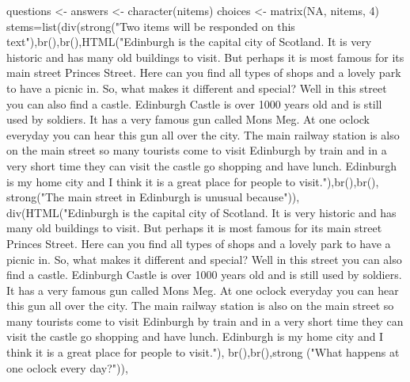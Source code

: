 \documentclass[
]{article}
\newenvironment{Shaded}{\begin{snugshade}}{\end{snugshade}}
\newcommand{\ConstantTok}[1]{\textcolor[rgb]{0.00,0.00,0.00}{#1}}
\newcommand{\DecValTok}[1]{\textcolor[rgb]{0.00,0.00,0.81}{#1}}
\newcommand{\FunctionTok}[1]{\textcolor[rgb]{0.00,0.00,0.00}{#1}}
\newcommand{\NormalTok}[1]{#1}
\newcommand{\OtherTok}[1]{\textcolor[rgb]{0.56,0.35,0.01}{#1}}
\newcommand{\StringTok}[1]{\textcolor[rgb]{0.31,0.60,0.02}{#1}}
\begin{document}
\begin{Shaded}
\begin{Highlighting}[]
\NormalTok{questions }\OtherTok{\textless{}{-}}\NormalTok{ answers }\OtherTok{\textless{}{-}} \FunctionTok{character}\NormalTok{(nitems)}
\NormalTok{choices }\OtherTok{\textless{}{-}} \FunctionTok{matrix}\NormalTok{(}\ConstantTok{NA}\NormalTok{, nitems, }\DecValTok{4}\NormalTok{)}
\NormalTok{stems}\OtherTok{=}\FunctionTok{list}\NormalTok{(}\FunctionTok{div}\NormalTok{(}\FunctionTok{strong}\NormalTok{(}\StringTok{"Two items will be responded on this text"}\NormalTok{),}\FunctionTok{br}\NormalTok{(),}\FunctionTok{br}\NormalTok{(),}\FunctionTok{HTML}\NormalTok{(}\StringTok{"Edinburgh is the capital city of Scotland. It is very historic and has many old buildings to visit. But perhaps it is most famous for its main street  Princes Street. Here can you find all types of shops and a lovely park to have a picnic in. So, what makes it different and special? Well in this street you can also find a castle. Edinburgh Castle is over 1000 years old and is still used by soldiers. It has a very famous gun called Mons Meg. At one oclock everyday you can hear this gun all over the city. The main railway station is also on the main street so many tourists come to visit Edinburgh by train and in a very short time they can visit the castle go shopping and have lunch. Edinburgh is my home city and I think it is a great place for people to visit."}\NormalTok{),}\FunctionTok{br}\NormalTok{(),}\FunctionTok{br}\NormalTok{(), }\FunctionTok{strong}\NormalTok{(}\StringTok{"The main street in Edinburgh is unusual because"}\NormalTok{)),}
           \FunctionTok{div}\NormalTok{(}\FunctionTok{HTML}\NormalTok{(}\StringTok{"Edinburgh is the capital city of Scotland. It is very historic and has many old buildings to visit. But perhaps it is most famous for its main street  Princes Street. Here can you find all types of shops and a lovely park to have a picnic in. So, what makes it different and special? Well in this street you can also find a castle. Edinburgh Castle is over 1000 years old and is still used by soldiers. It has a very famous gun called Mons Meg. At one oclock everyday you can hear this gun all over the city. The main railway station is also on the main street so many tourists come to visit Edinburgh by train and in a very short time they can visit the castle go shopping and have lunch. Edinburgh is my home city and I think it is a great place for people to visit."}\NormalTok{), }\FunctionTok{br}\NormalTok{(),}\FunctionTok{br}\NormalTok{(),}\FunctionTok{strong}\NormalTok{ (}\StringTok{"What happens at one oclock every day?"}\NormalTok{)),}

\end{Highlighting}
\end{Shaded}
\end{document}
